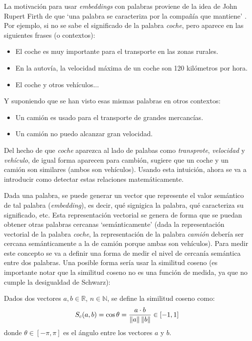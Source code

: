 La motivación para usar \textit{embeddings} con palabras proviene de la idea de John Rupert
Firth de que `una palabra se caracteriza por la compañía que mantiene' \cite{firth1957synopsis}. Por ejemplo, si no se sabe
el significado de la palabra \textit{coche}, pero aparece en las siguientes frases (o contextos):
\begin{itemize}
    \item El coche es muy importante para el transporte en las zonas rurales.
    \item En la autovía, la velocidad máxima de un coche son 120 kilómetros por hora.
    \item El coche y otros vehículos...
\end{itemize}
Y suponiendo que se han visto esas mismas palabras en otros contextos:
\begin{itemize}
    \item Un camión es usado para el transporte de grandes mercancías.
    \item Un camión no puedo alcanzar gran velocidad.
\end{itemize}
Del hecho de que \textit{coche} aparezca al lado de palabas como \textit{transprote}, \textit{velocidad} y \textit{vehículo},
de igual forma aparecen para cambión, sugiere que un coche y un camión son similares (ambos son vehículos). Usando esta intuición,
ahora se va a introducir como detectar estas relaciones matemáticamente.


Dada una palabra, se puede generar un vector que represente el valor semántico de tal palabra (\textit{embedding}), es decir, qué signigica la palabra, qué caracteriza
su significado, etc. Esta representación vectorial se genera de forma que se puedan obtener otras palabras
cercanas `semánticamente' (dada la representación vectorial de la palabra \textit{coche}, la representación de la palabra \textit{camión}
debería ser cercana semánticamente a la de camión porque ambas son vehículos). Para medir este concepto se va a definir una forma de medir el nivel
de cercanía semántica entre dos palabras. Una posible forma sería usar la similitud coseno (es importante notar que la similitud coseno no es una función de medida,
ya que no cumple la desigualdad de Schwarz):

\begin{definition}
  Dados dos vectores $a,b\in\mathbb{R}$, $n\in\mathbb{N}$, se define la similitud coseno como:
  \[
    S_c(a,b)=\cos\theta = \frac{a\cdot b}{\left\lVert a\right\rVert\left\lVert b\right\rVert} \in [-1, 1]
  \]
donde $\theta\in[-\pi,\pi]$ es el ángulo entre los vectores $a$ y $b$.
\end{definition}

